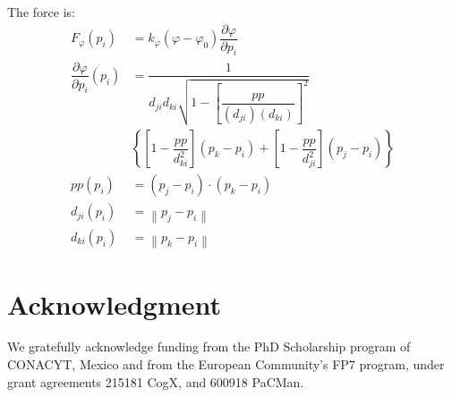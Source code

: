 \documentclass[journal]{IEEEtran}
\begin{document}
The force is:
\begin{align}
 F_\varphi(p_i) & = k_\varphi(\varphi - \varphi_0)\dfrac{\partial \varphi}{\partial p_i} \\
 \dfrac{\partial \varphi}{\partial p_i}(p_i) & =
    \dfrac{1}{d_{ji}d_{ki}\sqrt{1-\left[\dfrac{pp}{(d_{ji}) (d_{ki})}\right]^2}} \nonumber \\
 & \left\{\left[1-\dfrac{pp}{d_{ki}^2}\right](p_k-p_i)+\left[1-\dfrac{pp}{d_{ji}^2}\right](p_j-p_i) \right\} \nonumber \\
 pp(p_i) & =(p_j-p_i)\cdot(p_k-p_i) \nonumber \\
 d_{ji}(p_i) & = \left\| p_j-p_i \right\| \nonumber \\
 d_{ki}(p_i) & = \left\| p_k-p_i \right\|
\end{align}




\section*{Acknowledgment}

We gratefully acknowledge funding from the PhD Scholarship program of CONACYT, Mexico and from the European Community's FP7 program, under grant agreements 215181 CogX, and 600918 PaCMan.


\ifCLASSOPTIONcaptionsoff
  \newpage
\fi


\balance



%


\end{document}
